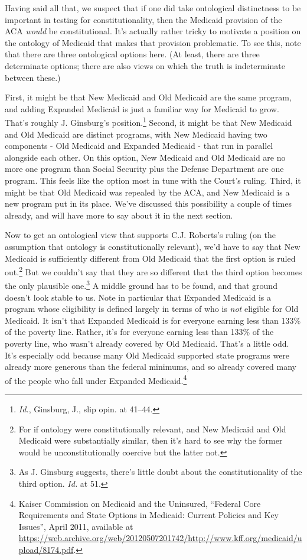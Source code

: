 \documentclass[
  11pt,
  letterpaper,
  DIV=11,
  numbers=noendperiod,
  twoside]{scrartcl}
\begin{document}
Having said all that, we suspect that if one did take ontological
distinctness to be important in testing for constitutionality, then the
Medicaid provision of the ACA \emph{would} be constitutional. It's
actually rather tricky to motivate a position on the ontology of
Medicaid that makes that provision problematic. To see this, note that
there are three ontological options here. (At least, there are three
determinate options; there are also views on which the truth is
indeterminate between these.)

First, it might be that New Medicaid and Old Medicaid are the same
program, and adding Expanded Medicaid is just a familiar way for
Medicaid to grow. That's roughly J. Ginsburg's position.\footnote{\emph{Id.},
  Ginsburg, J., slip opin. at 41--44.} Second, it might be that New
Medicaid and Old Medicaid are distinct programs, with New Medicaid
having two components - Old Medicaid and Expanded Medicaid - that run in
parallel alongside each other. On this option, New Medicaid and Old
Medicaid are no more one program than Social Security plus the Defense
Department are one program. This feels like the option most in tune with
the Court's ruling. Third, it might be that Old Medicaid was repealed by
the ACA, and New Medicaid is a new program put in its place. We've
discussed this possibility a couple of times already, and will have more
to say about it in the next section.

Now to get an ontological view that supports C.J. Roberts's ruling (on
the assumption that ontology is constitutionally relevant), we'd have to
say that New Medicaid is sufficiently different from Old Medicaid that
the first option is ruled out.\footnote{For if ontology were
  constitutionally relevant, and New Medicaid and Old Medicaid were
  substantially similar, then it's hard to see why the former would be
  unconstitutionally coercive but the latter not.} But we couldn't say
that they are so different that the third option becomes the only
plausible one.\footnote{As J. Ginsburg suggests, there's little doubt
  about the constitutionality of the third option. \emph{Id.} at 51.} A
middle ground has to be found, and that ground doesn't look stable to
us. Note in particular that Expanded Medicaid is a program whose
eligibility is defined largely in terms of who is \emph{not} eligible
for Old Medicaid. It isn't that Expanded Medicaid is for everyone
earning less than 133\% of the poverty line. Rather, it's for everyone
earning less than 133\% of the poverty line, who wasn't already covered
by Old Medicaid. That's a little odd. It's especially odd because many
Old Medicaid supported state programs were already more generous than
the federal minimums, and so already covered many of the people who fall
under Expanded Medicaid.\footnote{Kaiser Commission on Medicaid and the
  Uninsured, ``Federal Core Requirements and State Options in Medicaid:
  Current Policies and Key Issues'', April 2011, available at
  \url{https://web.archive.org/web/20120507201742/http://www.kff.org/medicaid/upload/8174.pdf}.}
\end{document}

